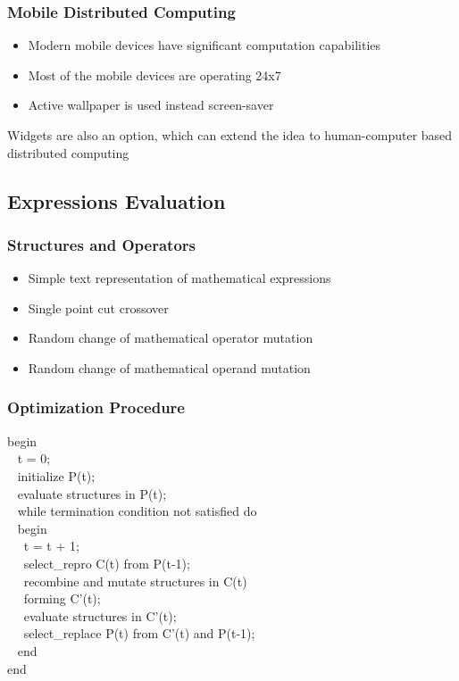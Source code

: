 \documentclass{beamer}
\begin{document}
\begin{frame}
\frametitle{Mobile Distributed Computing}
\begin{itemize}
	\item Modern mobile devices have significant computation capabilities
	\item Most of the mobile devices are operating 24x7
	\item Active wallpaper is used instead screen-saver
\end{itemize}
Widgets are also an option, which can extend the idea to human-computer based distributed computing
\end{frame}

\subsection{Expressions Evaluation}

\begin{frame}
\frametitle{Structures and Operators}
\begin{itemize}
	\item Simple text representation of mathematical expressions
	\item Single point cut crossover
	\item Random change of mathematical operator mutation
	\item Random change of mathematical operand mutation
\end{itemize}
\end{frame}

\begin{frame}
\frametitle{Optimization Procedure}
\small
begin \\
~  t = 0; \\
~  initialize P(t); \\
~  evaluate structures in P(t); \\
~  while termination condition not satisfied do \\
~  begin \\
~~    t = t + 1; \\
~~    select\_repro C(t) from P(t-1); \\
~~    recombine and mutate structures in C(t) \\
~~    forming C'(t); \\
~~    evaluate structures in C'(t); \\
~~    select\_replace P(t) from C'(t) and P(t-1); \\
~  end \\
end \\
\end{frame}
\end{document}
